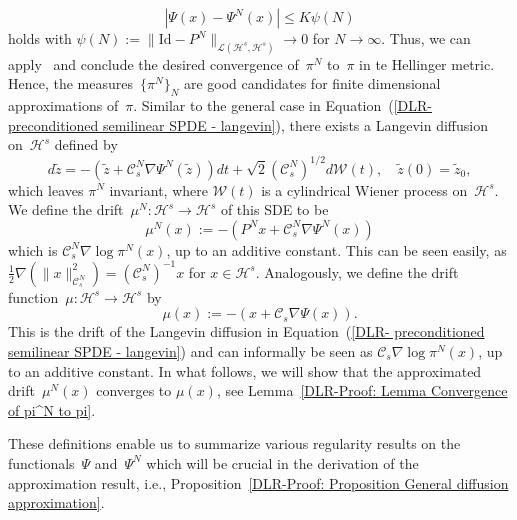 \begin{equation*}
 | \Psi (x) - \Psi^N (x) | \leq K \psi(N) 
\end{equation*}
holds with $\psi(N) := \| \text{Id} - P^N \|_{\mathcal{L}(\mathcal{H}^s, \mathcal{H}^s)} \to 0$ for $N \to \infty$. Thus, we can apply~\autocite[Theorem 2.6]{Cotter2010} and conclude the desired convergence of~$\pi^N$ to~$\pi$ in te Hellinger metric. Hence, the measures~$\{ \pi^N \}_N$ are good candidates for finite dimensional approximations of~$\pi$. Similar to the general case in Equation~(\ref{DLR- preconditioned semilinear SPDE - langevin}), there exists a Langevin diffusion on~$\mathcal{H}^s$ defined by
\begin{equation}
 d \tilde{z} = - ( \tilde{z} + \mathcal{C}_s^N \nabla \Psi^N (\tilde{z}) ) dt + \sqrt{2} (\mathcal{C}_s^N)^{1/2} d \mathcal{W}(t), \quad \tilde{z}(0) = \tilde{z}_0,
\end{equation}
which  leaves $ \pi^{N} $ invariant, where $\mathcal{W}(t)$ is a cylindrical Wiener process on~$\mathcal{H}^s$. We define the drift~$\mu^N: \mathcal{H}^s \to \mathcal{H}^s$ of this SDE to be
\begin{equation}
\label{DLR-Setting: Definition aproximated drift mu^N}
 \mu^N (x) := - \left(  P^N x + \mathcal{C}_s^N \nabla \Psi^N (x)  \right)
\end{equation}
which is $ \mathcal{C}_s^{N} \nabla \log \pi^{N} (x) $, up to an additive constant. This can be seen easily, as $ \tfrac{1}{2}  \nabla \left( \| x \|_{\mathcal{C}_s^N}^2 \right) = (\mathcal{C}_s^N)^{-1} x  $ for $x \in \mathcal{H}^s$. Analogously, we define the drift function~$\mu : \mathcal{H}^s \to \mathcal{H}^s$ by
\begin{equation}
\label{DLR-Setting: Definition drift mu}
 \mu(x) := - (x + \mathcal{C}_s \nabla \Psi (x) ).
\end{equation}
This is the drift of the Langevin diffusion in Equation~(\ref{DLR- preconditioned semilinear SPDE - langevin}) and can informally be seen as  $ \mathcal{C}_s \nabla \log \pi^{N} (x) $, up to an additive constant. In what follows, we will show that the approximated drift~$\mu^N(x)$ converges to $\mu(x)$, see Lemma~\ref{DLR-Proof: Lemma Convergence of pi^N to pi}.

These definitions enable us to summarize various regularity results on the functionals~$\Psi$ and~$\Psi^N$ which will be crucial in the derivation of the approximation result, i.e., Proposition~\ref{DLR-Proof: Proposition General diffusion approximation}.

